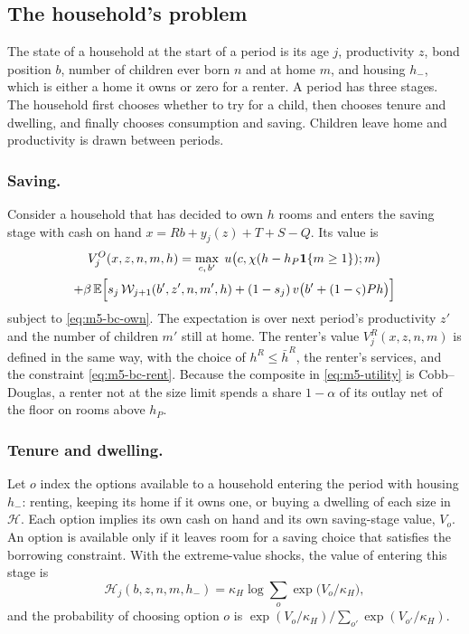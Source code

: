 \subsection{The household's problem}
\label{sec:m5-household}

The state of a household at the start of a period is its age $j$,
productivity $z$, bond position $b$, number of children ever born $n$ and at
home $m$, and housing $h_{-}$, which is either a home it owns or zero for a
renter. A period has three stages. The household first chooses whether to try
for a child, then chooses tenure and dwelling, and finally chooses consumption
and saving. Children leave home and productivity is drawn between periods.

\subsubsection*{Saving.}
Consider a household that has decided to own $h$ rooms and enters the saving
stage with cash on hand $x=Rb+y_j(z)+T+S-Q$. Its value is
\begin{multline}
 V^O_j(x,z,n,m,h)=\max_{c,\,b'}\;u\bigl(c,\chi(h-h_P\mathbf 1\{m\geq1\});m\bigr)\\
 +\beta\,\mathbb E\Bigl[s_j\,\mathcal W_{j+1}(b',z',n,m',h)+(1-s_j)\,v\bigl(b'+(1-\varsigma)Ph\bigr)\Bigr]
 \label{eq:m5-vown}
\end{multline}
subject to \eqref{eq:m5-bc-own}. The expectation is over next period's
productivity $z'$ and the number of children $m'$ still at home. The renter's
value $V^R_j(x,z,n,m)$ is defined in the same way, with the choice of $h^R\leq
\bar h^R$, the renter's services, and the constraint \eqref{eq:m5-bc-rent}.
Because the composite in \eqref{eq:m5-utility} is Cobb--Douglas, a renter not
at the size limit spends a share $1-\alpha$ of its outlay net of the floor on
rooms above $h_P$.

\subsubsection*{Tenure and dwelling.}
Let $o$ index the options available to a household entering the period with
housing $h_{-}$: renting, keeping its home if it owns one, or buying a dwelling
of each size in $\mathcal H$. Each option implies its own cash on hand and its
own saving-stage value, $V_o$. An option is available only if it leaves room
for a saving choice that satisfies the borrowing constraint. With the
extreme-value shocks, the value of entering this stage is
\begin{equation}
 \mathcal H_j(b,z,n,m,h_{-})=\kappa_H\log\sum_{o}\exp\bigl(V_o/\kappa_H\bigr),
 \label{eq:m5-tenure}
\end{equation}
and the probability of choosing option $o$ is
$\exp(V_o/\kappa_H)/\sum_{o'}\exp(V_{o'}/\kappa_H)$.

